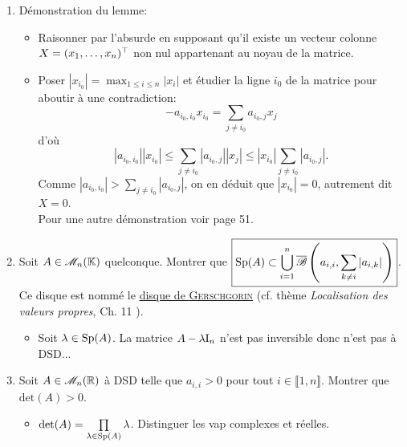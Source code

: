 \begin{enumerate}
    \item Démonstration du lemme:
    \begin{itemize}
        \item Raisonner par l'absurde en supposant qu'il existe un vecteur colonne $X = (x_1, \dots, x_n)^\top$ non nul appartenant au noyau de la matrice. 
        \item Poser $\boxed{\displaystyle \left |x_{i_0} \right|= \max_{1 \leqslant i \leqslant n} |x_i|}$ et étudier la ligne $i_0$  de la matrice pour aboutir à une contradiction:
        $$-a_{i_0, i_0} x_{i_0} = \sum_{j \not = i_0} a_{i_0,j} x_j$$
        d'où
        $$|a_{i_0, i_0}| |x_{i_0}| \leqslant \sum_{j \not = i_0} |a_{i_0,j}| |x_j| \leqslant |x_{i_0}| \sum_{j \not = i_0} |a_{i_0, j}|.$$
        Comme $|a_{i_0, i_0}| > \sum\limits_{j \not = i_0} |a_{i_0, j}|$, on en déduit que $|x_{i_0}| = 0$, autrement dit $X = 0$. \\
        Pour une autre démonstration voir \cite{matrices} page 51. 
    \end{itemize}
    
    \item Soit $A \in \mathscr{M}_n(\mathbb{K})$ quelconque. Montrer que  $\boxed{\mathrm{Sp}(A) \subset \bigcup\limits_{i=1}^{n} \overline{\mathscr{B}} \left( a_{i,i}, \sum\limits_{k \not = i} |a_{i,k}| \right)}$. \\
    Ce disque est nommé le \href{https://fr.wikipedia.org/wiki/Théorème_de_Gerschgorin}{disque de \textsc{Gerschgorin}} (cf. thème \textit{Localisation des valeurs propres}, Ch. 11 \cite{acamanes}).
    \begin{itemize}
        \item Soit $\lambda \in \mathrm{Sp}(A)$. La matrice $A - \lambda \mathrm{I}_n$ n'est pas inversible donc n'est pas à DSD...
    \end{itemize}
    \item Soit $A \in \mathscr{M}_n(\mathbb{R})$ à DSD telle que $a_{i,i} > 0$ pour tout $i \in \llbracket 1, n \rrbracket$. Montrer que $\mathrm{det}(A) > 0$. 
    \begin{itemize}
        \item $\det(A) = \prod\limits_{\lambda \in \mathrm{Sp}(A)} \lambda$. Distinguer les vap complexes et réelles. 
    \end{itemize}
\end{enumerate}